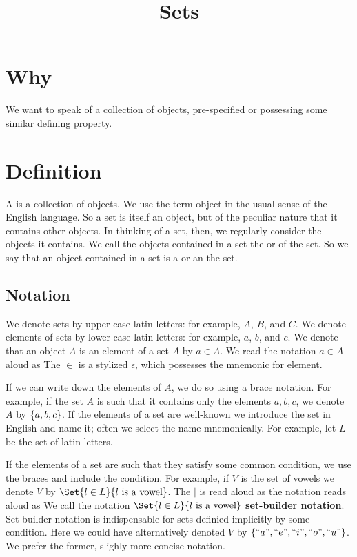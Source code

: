 





\title{Sets}

\section{Why}

We want to speak of a collection of objects, pre-specified or possessing some similar defining property.

\section{Definition}

A  is a collection of objects.
We use the term object in the usual sense of the English language.
So a set is itself an object, but of the peculiar nature that it contains other objects.
In thinking of a set, then, we regularly consider the objects it contains.
We call the objects contained in a set the  or  of the set.
So we say that an object contained in a set is a  or an  the set.

\subsection{Notation}

We denote sets by upper case latin letters: for example, $A$, $B$, and $C$.
We denote elements of sets by lower case latin letters: for example, $a$, $b$, and $c$.
We denote that an object $A$ is an element of a set $A$ by $a \in A$.
We read the notation $a \in A$ aloud as 
The $\in$ is a stylized $\epsilon$, which possesses the mnemonic for element.

If we can write down the elements of $A$, we do so using a brace notation.
For example, if the set $A$ is such that it contains only the elements $a, b, c$, we denote $A$ by $\{a, b, c\}$.
If the elements of a set are well-known we introduce the set in English and name it; often we select the name mnemonically.
For example, let $L$ be the set of latin letters.

If the elements of a set are such that they satisfy some common condition, we use the braces and include the condition.
For example, if $V$ is the set of vowels we denote $V$ by $\Set{l \in L}{l \text{ is a vowel}}$.
The $\mid$ is read aloud as  the notation reads aloud as 
We call the notation $\Set{l \in L}{l \text{ is a vowel}}$ \textbf{set-builder notation}.
Set-builder notation is indispensable for sets definied implicitly by some condition.
Here we could have alternatively denoted $V$ by $\{``a",``e",``i",``o",``u"\}$.
We prefer the former, slighly more concise notation.

